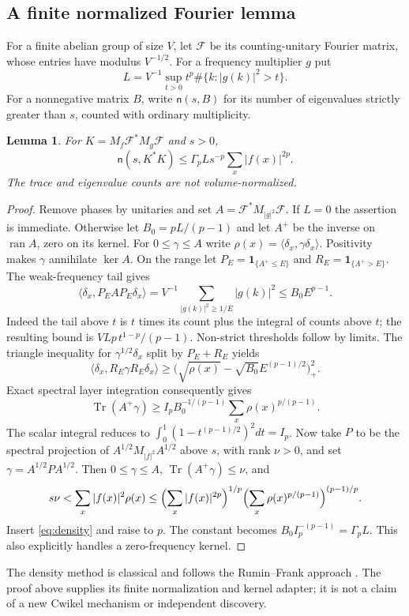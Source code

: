 \documentclass[11pt]{article}
\newtheorem{lemma}{Lemma}
\newcommand{\Tr}{\operatorname{Tr}}
\newcommand{\nct}{\mathsf n}
\begin{document}
\subsection{A finite normalized Fourier lemma}
For a finite abelian group of size $V$, let $\mathcal F$ be its counting-unitary Fourier
matrix, whose entries have modulus $V^{-1/2}$. For a frequency multiplier $g$ put
\[
 L=V^{-1}\sup_{t>0}t^p\#\{k:|g(k)|^2>t\}.
\]
For a nonnegative matrix $B$, write $\nct(s,B)$ for its number of eigenvalues strictly
greater than $s$, counted with ordinary multiplicity.
\begin{lemma}\label{lem:finite}
For $K=M_f\mathcal F^*M_g\mathcal F$ and $s>0$,
\[
 \nct(s,K^*K)\leq\Gamma_p Ls^{-p}\sum_x|f(x)|^{2p}.
\]
The trace and eigenvalue counts are not volume-normalized.
\end{lemma}
\begin{proof}
Remove phases by unitaries and set $A=\mathcal F^*M_{|g|^2}\mathcal F$.
If $L=0$ the assertion is immediate. Otherwise let $B_0=pL/(p-1)$ and let $A^+$
be the inverse on $\operatorname{ran}A$, zero on its kernel. For $0\leq\gamma\leq A$
write $\rho(x)=\langle\delta_x,\gamma\delta_x\rangle$. Positivity makes $\gamma$
annihilate $\ker A$. On the range let $P_E=\mathbf1_{\{A^+\leq E\}}$ and
$R_E=\mathbf1_{\{A^+>E\}}$. The weak-frequency tail gives
\[
 \langle\delta_x,P_EAP_E\delta_x\rangle
 =V^{-1}\sum_{|g(k)|^2\geq1/E}|g(k)|^2\leq B_0E^{p-1}.
\]
Indeed the tail above $t$ is $t$ times its count plus the integral of counts above $t$;
the resulting bound is $VLp\,t^{1-p}/(p-1)$. Non-strict thresholds follow by limits.
The triangle inequality for $\gamma^{1/2}\delta_x$ split by $P_E+R_E$ yields
\[
 \langle\delta_x,R_E\gamma R_E\delta_x\rangle
 \geq\bigl(\sqrt{\rho(x)}-\sqrt{B_0}E^{(p-1)/2}\bigr)_+^2.
\]
Exact spectral layer integration consequently gives
\begin{equation}\label{eq:density}
 \Tr(A^+\gamma)\geq I_pB_0^{-1/(p-1)}\sum_x\rho(x)^{p/(p-1)}.
\end{equation}
The scalar integral reduces to
$\int_0^1(1-t^{(p-1)/2})^2dt=I_p$.
Now take $P$ to be the spectral projection of $A^{1/2}M_{|f|^2}A^{1/2}$ above $s$,
with rank $\nu>0$, and set $\gamma=A^{1/2}PA^{1/2}$. Then
$0\leq\gamma\leq A$, $\Tr(A^+\gamma)\leq\nu$, and
\[
 s\nu<\sum_x|f(x)|^2\rho(x)
 \leq\Bigl(\sum_x|f(x)|^{2p}\Bigr)^{1/p}
       \Bigl(\sum_x\rho(x)^{p/(p-1)}\Bigr)^{(p-1)/p}.
\]
Insert \eqref{eq:density} and raise to $p$. The constant becomes
$B_0I_p^{-(p-1)}=\Gamma_pL$. This also explicitly handles a zero-frequency kernel.
\end{proof}
The density method is classical and follows the Rumin--Frank approach
\cite[Section 2]{frank}. The proof above supplies its finite normalization and kernel
adapter; it is not a claim of a new Cwikel mechanism or independent discovery.
\end{document}
